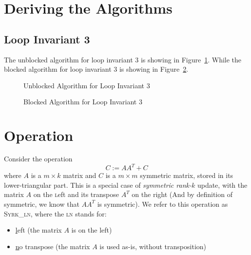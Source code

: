 \documentclass[12pt]{article}
\begin{document}
\section{Deriving the Algorithms}

\subsection{Loop Invariant 3}

The unblocked algorithm for loop invariant 3 is showing in Figure~\ref{fig:unb_inv1}. While the blocked algorithm for loop invariant 3 is showing in Figure~\ref{fig:blk_inv3}.


\resetsteps



\begin{figure}
	\begin{center}
		\FlaWorksheet
	\end{center}
	\caption{Unblocked Algorithm for Loop Invariant 3}
	\label{fig:unb_inv1}
\end{figure}


\resetsteps



\begin{figure}
	\begin{center}
		\FlaWorksheet
	\end{center}
	\caption{Blocked Algorithm for Loop Invariant 3}
	\label{fig:blk_inv3}
\end{figure}


\newpage


\section{Operation}

Consider the operation  
\[
C := A A^T + C
\]
where \( A \) is a \( m \times k \) matrix and \( C \) is a \( m \times m \) symmetric matrix, stored in its lower-triangular part. This is a special case of  
\textit{symmetric rank-\( k \)} update,  
with the matrix \( A \) on the \textsc{l}eft and its transpose \( A^T \) on the right (And by definition of symmetric, we know that $AA^T$ is symmetric).  
We refer to this operation as  
\textsc{Syrk\_ln}, where the \textsc{ln} stands for:
\begin{itemize}
  \item \underline{l}eft (the matrix \( A \) is on the left)
  \item \underline{n}o transpose (the matrix \( A \) is used as-is, without transposition)
\end{itemize}
\end{document}
